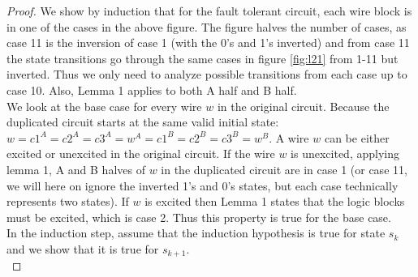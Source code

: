 \documentclass[12pt]{report}
\begin{document}
\begin{proof}
We show by induction that for the fault tolerant circuit, each wire block is in one of the cases in the above figure.  The figure halves the number of cases, as case 11 is the inversion of case 1 (with the 0's and 1's inverted) and from case 11 the state transitions go through the same cases in figure \ref{fig:l21} from 1-11 but inverted.  Thus we only need to analyze possible transitions from each case up to case 10.  Also, Lemma 1 applies to both A half and B half.\\

We look at the base case for every wire $w$ in the original circuit.  Because the duplicated circuit starts at the same valid initial state: $w=c1^A=c2^A=c3^A=w^A=c1^B=c2^B=c3^B=w^B$.  A wire $w$ can be either excited or unexcited in the original circuit. If the wire $w$ is unexcited, applying lemma 1,  A and B halves of $w$ in the duplicated circuit are in case 1 (or case 11, we will here on ignore the inverted 1's and 0's states, but each case technically represents two states).  If $w$ is excited then Lemma 1 states that the logic blocks must be excited, which is case 2.  Thus this property is true for the base case. \\

In the induction step, assume that the induction hypothesis is true for state $s_k$ and we show that it is true for $s_{k+1}$.  \\


\end{proof}
\end{document}

